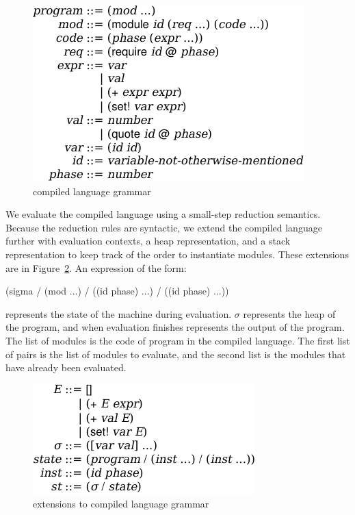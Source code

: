 \documentclass[ms,electronic,letterpaper,lol,lof,lot]{byumsphd}
\begin{document}
\begin{figure}[h]
\includegraphics{compiled-lang}
\caption{compiled language grammar}
\label{compiled-lang}
\end{figure}

We evaluate the compiled language using a small-step reduction semantics. 
Because the reduction rules are syntactic, we extend the compiled language further with evaluation contexts, a heap representation, and a stack representation to keep track of the order to instantiate modules.
These extensions are in Figure~\ref{compiled-eval-lang}.
An expression of the form:
\begin{schemedisplay}
(sigma / (mod ...) / ((id phase) ...)  / ((id phase) ...))
\end{schemedisplay}
represents the state of the machine during evaluation.
$\sigma$ represents the heap of the program, and when evaluation finishes represents the output of the program.
The list of modules is the code of program in the compiled language.
The first list of  pairs is the list of modules to evaluate, and the second list is the modules that have already been evaluated.

\begin{figure}[h]
\includegraphics{compiled-eval-lang}
\caption{extensions to compiled language grammar}
\label{compiled-eval-lang}
\end{figure}
\end{document}
